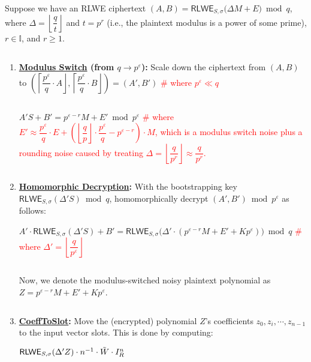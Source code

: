 \begin{tcolorbox}[title={\textbf{\tboxlabel{\ref*{subsubsec:bfv-bootstrapping-summary}} BFV Bootstrapping}}]

Suppose we have an RLWE ciphertext $(A, B)  = \textsf{RLWE}_{S, \sigma}\bm(\Delta M + E\bm) \bmod q$, where $\Delta = \left\lfloor\dfrac{q}{t}\right\rfloor$ and $t = p^r$ (i.e., the plaintext modulus is a power of some prime), $r \in \mathbb{I}$, and $r \geq 1$. 

$ $

\begin{enumerate}
\item \textbf{\underline{Modulus Switch} (from \boldmath$q \rightarrow p^\varepsilon$):} Scale down the ciphertext from $(A, B)$ to $\left(\left\lceil \dfrac{p^\varepsilon}{q}\cdot A\right\rfloor, \left\lceil \dfrac{p^\varepsilon}{q}\cdot B\right\rfloor\right) = (A', B')$ \textcolor{red}{ \# where $p^\varepsilon \ll q$} 

$ $

$A'S + B' = p^{\varepsilon-r}M + E' \bmod p^\varepsilon$ \textcolor{red}{ \# where $E' \approx \dfrac{p^\varepsilon}{q}\cdot E  + \left(\left\lfloor\dfrac{q}{p}\right\rfloor\cdot\dfrac{p^\varepsilon}{q} - p^{\varepsilon-r}\right)\cdot M$, which is a modulus switch noise plus a rounding noise caused by treating $\Delta=\left\lfloor\dfrac{q}{p^r}\right\rfloor \approx \dfrac{q}{p^r}$.}

$ $

\item \textbf{\underline{Homomorphic Decryption}:} With the bootstrapping key $\textsf{RLWE}_{S, \sigma}(\Delta' S) \bmod q$, homomorphically decrypt $(A', B') \bmod p^\varepsilon$ as follows:

$A' \cdot \textsf{RLWE}_{S, \sigma}(\Delta' S)  + B' = \textsf{RLWE}_{S, \sigma}\bm(\Delta' \cdot (p^{\varepsilon-r} M + E' + Kp^\varepsilon)\bm) \bmod q$ \textcolor{red}{ \# where $\Delta' = \left\lfloor\dfrac{q}{p^\varepsilon}\right\rfloor$}

$ $

Now, we denote the modulus-switched noisy plaintext polynomial as $Z = p^{\varepsilon-r} M + E' + Kp^\varepsilon$.

$ $

\item \textbf{\textsf{\underline{CoeffToSlot}}:} Move the (encrypted) polynomial $Z$'s coefficients $z_0, z_i, \cdots, z_{n-1}$ to the input vector slots. This is done by computing: 

$\textsf{RLWE}_{S, \sigma}(\Delta' Z) \cdot n^{-1}\cdot \tilde{W}\cdot I_R^n$


\end{enumerate}
\end{tcolorbox}
